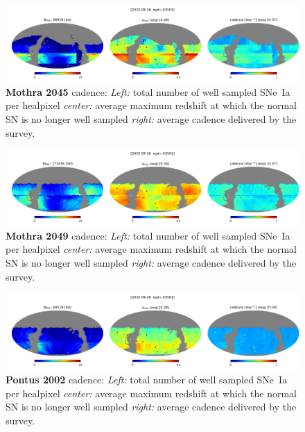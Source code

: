 \begin{figure}[h!]
  \begin{center}
    \includegraphics[width=\linewidth]{Figures/mothra_2045_64_maps.png}
    \caption{{\bf Mothra 2045} cadence: {\em Left:} total number of well
      sampled SNe~Ia per healpixel {\em center:} average maximum
      redshift at which the normal SN is no longer well sampled {\em
        right:} average cadence delivered by the survey.}
  \end{center}
\end{figure}

\begin{figure}[h!]
  \begin{center}
    \includegraphics[width=\linewidth]{Figures/mothra_2049_64_maps.png}
    \caption{{\bf Mothra 2049} cadence: {\em Left:} total number of well
      sampled SNe~Ia per healpixel {\em center:} average maximum
      redshift at which the normal SN is no longer well sampled {\em
        right:} average cadence delivered by the survey.}
  \end{center}
\end{figure}

\begin{figure}[h!]
  \begin{center}
    \includegraphics[width=\linewidth]{Figures/pontus_2002_64_maps.png}
    \caption{{\bf Pontus 2002} cadence: {\em Left:} total number of well
      sampled SNe~Ia per healpixel {\em center:} average maximum
      redshift at which the normal SN is no longer well sampled {\em
        right:} average cadence delivered by the survey.}
  \end{center}
\end{figure}


